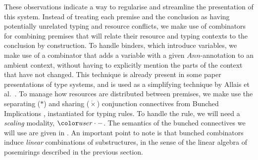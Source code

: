 These observations indicate a way to regularise and streamline the
presentation of this system. Instead of treating each premise and the
conclusion as having potentially unrelated typing and resource
conflicts, we make use of combinators for combining premises that will
relate their resource and typing contexts to the conclusion by
construction. To handle binders, which introduce variables, we make
use of a combinator that adds a variable with a given $Ann$-annotation
to an ambient context, without having to explicitly mention the parts
of the context that have not changed. This technique is already
present in some paper presentations of type systems, and is used as a
simplifying technique by Allais et al.~\cite{AACMM20}. To manage how
resources are distributed between premises, we make use the separating
($*$) and sharing ($\dot{\times}$) conjunction connectives from
Bunched Implications \cite{oHP99}, instantiated for typing rules. To
handle the  rule, we will need a
\emph{scaling} modality, $\gr r \cdot -$. The semantics of the bunched
connectives we will use are given in . An
important point to note is that bunched combinators induce
\emph{linear} combinations of substructures, in the sense of the
linear algebra of posemirings described in the previous section.


